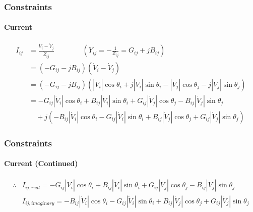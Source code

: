 \documentclass[
	11pt, %
	aspectratio=169, %
]{beamer}
\begin{document}

\begin{frame}
	\frametitle{Constraints}
	\framesubtitle{Current} %

	\begin{align*}
	 	I_{ij} &= \frac{\dot{V}_{i}-\dot{V}_{j}}{\dot{Z}_{ij}} \qquad \qquad \left(Y_{ij} =-\frac{1}{Z_{ij}} = G_{ij}+jB_{ij}\right)\\
		&=\left(-G_{ij}-jB_{ij}\right) \left(\dot{V}_{i}-\dot{V}_{j}\right) \\  
		&=\left(-G_{ij}-jB_{ij}\right) \left( \left\lvert \dot{V}_{i} \right\rvert \cos{\theta_{i}} + j\left\lvert \dot{V}_{i} \right\rvert \sin{\theta_{i}} - \left\lvert \dot{V}_{j} \right\rvert \cos{\theta_{j}} - j\left\lvert \dot{V}_{j} \right\rvert \sin{\theta_{j}}  \right) \\ 
		&= -G_{ij}\left\lvert \dot{V}_{i} \right\rvert \cos{\theta_{i}} + B_{ij}\left\lvert \dot{V}_{i} \right\rvert \sin{\theta_{i}} + G_{ij}\left\lvert \dot{V}_{j} \right\rvert \cos{\theta_{j}} - B_{ij}\left\lvert \dot{V}_{j} \right\rvert \sin{\theta_{j}}\\
		&\quad +j\left( -B_{ij}\left\lvert \dot{V}_{i} \right\rvert \cos{\theta_{i}} - G_{ij}\left\lvert \dot{V}_{i} \right\rvert \sin{\theta_{i}} + B_{ij}\left\lvert \dot{V}_{j} \right\rvert \cos{\theta_{j}} + G_{ij}\left\lvert \dot{V}_{j} \right\rvert \sin{\theta_{j}} \right) 
	\end{align*}

	
\end{frame}


\begin{frame}
	\frametitle{Constraints}
	\framesubtitle{Current (Continued)} %

	\begin{align*}
	 	\therefore &I_{ij,real} = -G_{ij}\left\lvert \dot{V}_{i} \right\rvert \cos{\theta_{i}} + B_{ij}\left\lvert \dot{V}_{i} \right\rvert \sin{\theta_{i}} + G_{ij}\left\lvert \dot{V}_{j} \right\rvert \cos{\theta_{j}} - B_{ij}\left\lvert \dot{V}_{j} \right\rvert \sin{\theta_{j}}\\
		 &I_{ij,imaginary} = -B_{ij}\left\lvert \dot{V}_{i} \right\rvert \cos{\theta_{i}} - G_{ij}\left\lvert \dot{V}_{i} \right\rvert \sin{\theta_{i}} + B_{ij}\left\lvert \dot{V}_{j} \right\rvert \cos{\theta_{j}} + G_{ij}\left\lvert \dot{V}_{j} \right\rvert \sin{\theta_{j}}
	\end{align*}

	
\end{frame}
\end{document}
